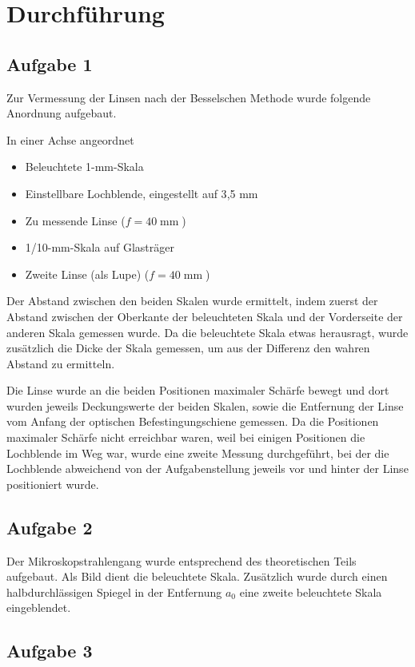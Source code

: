\documentclass[a4paper,german,12pt,smallheadings]{scrartcl}
\begin{document}
\section{Durchführung}
\subsection{Aufgabe 1}
Zur Vermessung der Linsen nach der Besselschen Methode wurde folgende Anordnung
aufgebaut.

In einer Achse angeordnet
\begin{itemize}
  \item Beleuchtete 1-mm-Skala
  \item Einstellbare Lochblende, eingestellt auf 3{,}5 mm
  \item Zu messende Linse ($f = 40 \operatorname{mm}$)
  \item 1/10-mm-Skala auf Glasträger
  \item Zweite Linse (als Lupe) ($f = 40 \operatorname{mm}$)
\end{itemize}

Der Abstand zwischen den beiden Skalen wurde ermittelt, indem zuerst der Abstand
zwischen der Oberkante der beleuchteten Skala und der Vorderseite der anderen
Skala gemessen wurde. Da die beleuchtete Skala etwas herausragt, wurde
zusätzlich die Dicke der Skala gemessen, um aus der Differenz den wahren Abstand
zu ermitteln.

Die Linse wurde an die beiden Positionen maximaler Schärfe bewegt und dort wurden
jeweils Deckungswerte der beiden Skalen, sowie die Entfernung der Linse vom
Anfang der optischen Befestingungschiene gemessen.
Da die Positionen maximaler Schärfe nicht erreichbar waren, weil bei einigen
Positionen die Lochblende im Weg war, wurde eine zweite Messung durchgeführt,
bei der die Lochblende abweichend von der Aufgabenstellung jeweils vor
und hinter der Linse positioniert wurde.

\subsection{Aufgabe 2}

Der Mikroskopstrahlengang wurde entsprechend des theoretischen Teils aufgebaut.
Als Bild dient die beleuchtete Skala. Zusätzlich wurde durch einen
halbdurchlässigen Spiegel in der Entfernung $a_0$ eine zweite beleuchtete Skala
eingeblendet.

\subsection{Aufgabe 3}
\end{document}

